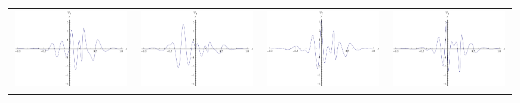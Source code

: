 \documentclass{article}
\begin{document}
\begin{landscape}
\begin{tabular}{cccc}
\includegraphics[width=5.0cm]{sextic_wavelet_5.pdf}& \includegraphics[width=5.0cm]{sextic_wavelet_6.pdf}& \includegraphics[width=5.0cm]{sextic_wavelet_7.pdf}& \includegraphics[width=5.0cm]{sextic_wavelet_8.pdf} \\
\end{tabular} 
 \end{landscape}
\end{document}
